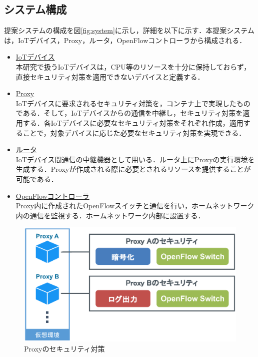 \documentclass[Japanese]{dicomopapers}
\begin{document}
\subsection{システム構成}
提案システムの構成を図\ref{fig:system}に示し，詳細を以下に示す．本提案システムは，IoTデバイス，Proxy，ルータ，OpenFlowコントローラから構成される．
\begin{itemize}
	\item \underline{IoTデバイス}\mbox{}\\
	      本研究で扱うIoTデバイスは，CPU等のリソースを十分に保持しておらず，直接セキュリティ対策を適用できないデバイスと定義する．
	\item \underline{Proxy}\mbox{}\\
	      IoTデバイスに要求されるセキュリティ対策を，コンテナ上で実現したものである．そして，IoTデバイスからの通信を中継し，セキュリティ対策を適用する．各IoTデバイスに必要なセキュリティ対策をそれぞれ作成，適用することで，対象デバイスに応じた必要なセキュリティ対策を実現できる．
	\item \underline{ルータ}\mbox{}\\
	      IoTデバイス間通信の中継機器として用いる．ルータ上にProxyの実行環境を生成する．Proxyが作成される際に必要とされるリソースを提供することが可能である．
	\item \underline{OpenFlowコントローラ}\mbox{}\\
	      Proxy内に作成されたOpenFlowスイッチと通信を行い，ホームネットワーク内の通信を監視する．ホームネットワーク内部に設置する．
\end{itemize}

\begin{figure}[!tb]
	\centering
	\includegraphics[width=\linewidth]{img/security.eps}
	\caption{Proxyのセキュリティ対策}
	\label{fig:security}
\end{figure}
\end{document}
